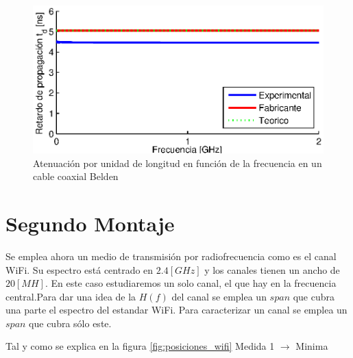 \documentclass[10pt,conference,a4paper]{IEEEtran}
\begin{document}
\begin{figure}[htb]
    \centering
    \includegraphics[width=\columnwidth]{figuras/retardo.eps}
    \caption{Atenuación por unidad de longitud en función de la frecuencia en un cable coaxial Belden}
    \label{fig:retardo_coaxial}
\end{figure}

\section{Segundo Montaje}

Se emplea ahora un medio de transmisión por radiofrecuencia como es el canal WiFi. Su espectro está centrado en $2.4[GHz]$ y los canales tienen un ancho de $20[MH]$. En este caso estudiaremos un solo canal, el que hay en la frecuencia central.Para dar una idea de la $H(f)$ del canal se emplea un $span$ que cubra una parte  el espectro del estandar WiFi. Para caracterizar un canal se emplea un $span$ que cubra sólo este.


Tal y como se explica en la figura \ref{fig:posiciones_wifi} 
Medida 1 $\rightarrow$ Minima 
\end{document}
